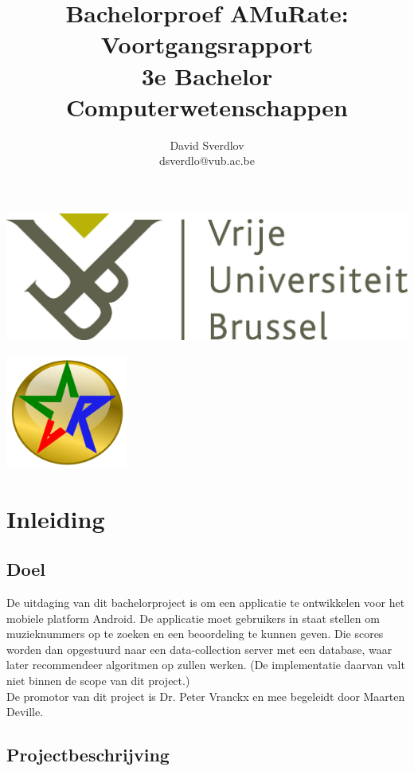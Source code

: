 \documentclass[11pt,a4paper]{article}
\author{David Sverdlov \\ dsverdlo@vub.ac.be}
\title{Bachelorproef AMuRate: Voortgangsrapport\\ 3e Bachelor Computerwetenschappen}
\begin{document}
\begin{flushleft}
\noindent \includegraphics[width=0.6\linewidth]{vub_logo.jpg} 
\end{flushleft}
{\let\newpage\relax\maketitle} %

\begin{center}
\includegraphics[width=4cm]{amr_gold_thick.png} 
\end{center}



\newpage
\tableofcontents

\newpage
\section{Inleiding}
	\subsection{Doel}
De uitdaging van dit bachelorproject is om een applicatie te ontwikkelen voor het mobiele platform Android. De applicatie moet gebruikers in staat stellen om muzieknummers op te zoeken en een beoordeling te kunnen geven. Die scores worden dan opgestuurd naar een data-collection server met een database, waar later recommendeer algoritmen op zullen werken. (De implementatie daarvan valt niet binnen de scope van dit project.) \\
De promotor van dit project is Dr. Peter Vranckx en mee begeleidt door Maarten Deville.

	\subsection{Projectbeschrijving}
	
\end{document}
